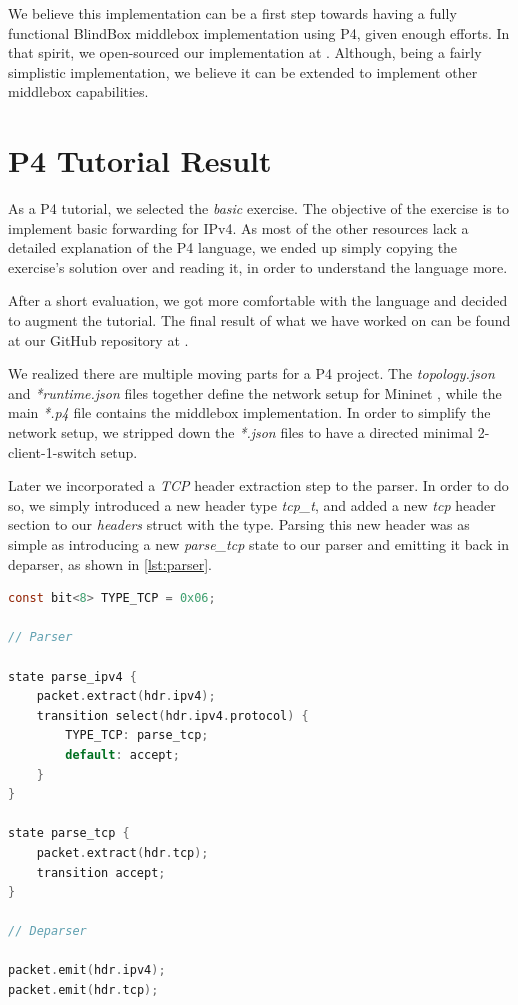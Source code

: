 \documentclass{winslabreport}
\begin{document}
We believe this implementation can be a first step towards having a fully functional BlindBox middlebox implementation using P4, given enough efforts. In that spirit, we open-sourced our implementation at \cite{groupf}. Although, being a fairly simplistic implementation, we believe it can be extended to implement other middlebox capabilities.

\appendix

\section{P4 Tutorial Result}

As a P4 tutorial, we selected the \emph{basic} exercise. The objective of the exercise is to implement basic forwarding for IPv4. As most of the other resources lack a detailed explanation of the P4 language, we ended up simply copying the exercise's solution over and reading it, in order to understand the language more.

After a short evaluation, we got more comfortable with the language and decided to augment the tutorial. The final result of what we have worked on can be found at our GitHub repository at \cite{groupf}. 

We realized there are multiple moving parts for a P4 project. The \emph{topology.json} and \emph{*runtime.json} files together define the network setup for Mininet \cite{Lantz:2010:NLR:1868447.1868466}, while the main \emph{*.p4} file contains the middlebox implementation. In order to simplify the network setup, we stripped down the \emph{*.json} files to have a directed minimal 2-client-1-switch setup.

Later we incorporated a \emph{TCP} header extraction step to the parser. In order to do so, we simply introduced a new header type \emph{tcp\_t}, and added a new \emph{tcp} header section to our \emph{headers} struct with the type. Parsing this new header was as simple as introducing a new \emph{parse\_tcp} state to our parser and emitting it back in deparser, as shown in \autoref{lst:parser}.

\begin{lstlisting}[caption={P4 Parser Snippet},label={lst:parser},language=C]
const bit<8> TYPE_TCP = 0x06;

// Parser

state parse_ipv4 {
    packet.extract(hdr.ipv4);
    transition select(hdr.ipv4.protocol) {
        TYPE_TCP: parse_tcp;
        default: accept;
    }
}

state parse_tcp {
    packet.extract(hdr.tcp);
    transition accept;
}

// Deparser

packet.emit(hdr.ipv4);
packet.emit(hdr.tcp);
\end{lstlisting}
\end{document}
